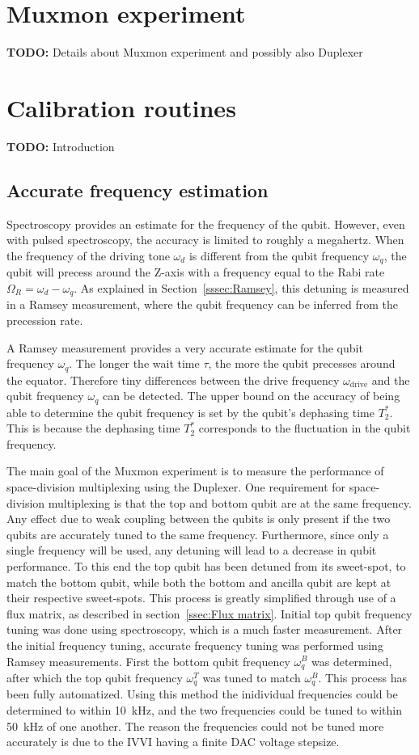   \chapter{Muxmon experiment}
    \textbf{TODO:} Details about Muxmon experiment and possibly also Duplexer

  \chapter{Calibration routines}
    \textbf{TODO:} Introduction
    \section{Accurate frequency estimation}
      Spectroscopy provides an estimate for the frequency of the qubit. However, even with pulsed spectroscopy, the accuracy is limited to roughly a megahertz. When the frequency of the driving tone $\omega_d$ is different from the qubit frequency $\omega_q$, the qubit will precess around the Z-axis with a frequency equal to the Rabi rate $\Omega_R = \omega_d - \omega_q$. As explained in Section~\ref{sssec:Ramsey}, this detuning is measured in a Ramsey measurement, where the qubit frequency can be inferred from the precession rate.

      A Ramsey measurement provides a very accurate estimate for the qubit frequency $\omega_q$. The longer the wait time $\tau$, the more the qubit precesses around the equator. Therefore tiny differences between the drive frequency $\omega_\text{drive}$ and the qubit frequency $\omega_q$ can be detected. The upper bound on the accuracy of being able to determine the qubit frequency is set by the qubit's dephasing time $T_2^*$. This is because the dephasing time $T_2^*$ corresponds to the fluctuation in the qubit frequency.

      The main goal of the Muxmon experiment is to measure the performance of space-division multiplexing using the Duplexer. One requirement for space-division multiplexing is that the top and bottom qubit are at the same frequency. Any effect due to weak coupling between the qubits is only present if the two qubits are accurately tuned to the same frequency. Furthermore, since only a single frequency will be used, any detuning will lead to a decrease in qubit performance. To this end the top qubit has been detuned from its sweet-spot, to match the bottom qubit, while both the bottom and ancilla qubit are kept at their respective sweet-spots. This process is greatly simplified through use of a flux matrix, as described in section~\ref{ssec:Flux matrix}. Initial top qubit frequency tuning was done using spectroscopy, which is a much faster measurement. After the initial frequency tuning, accurate frequency tuning was performed using Ramsey measurements. First the bottom qubit frequency $\omega_q^B$ was determined, after which the top qubit frequency $\omega_q^T$  was tuned to match $\omega_q^B$. This process has been fully automatized. Using this method the inidividual frequencies could be determined to within \SI{10}{\kilo \hertz}, and the two frequencies could be tuned to within \SI{50}{\kilo \hertz} of one another. The reason the frequencies could not be tuned more accurately is due to the IVVI having a finite DAC voltage stepsize.

